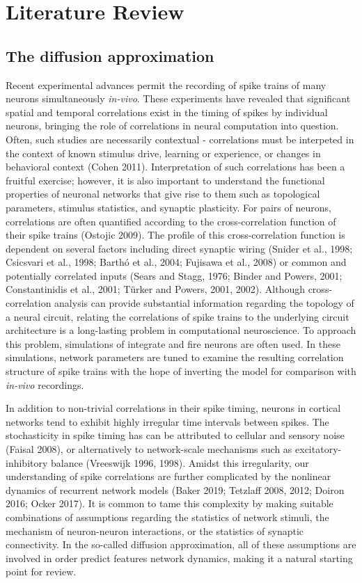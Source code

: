 \documentclass{ucetd}
\begin{document}
\section{Literature Review}

\subsection{The diffusion approximation}

Recent experimental advances permit the recording of spike trains of many neurons simultaneously \emph{in-vivo}. These experiments have revealed that significant spatial and temporal correlations exist in the timing of spikes by individual neurons, bringing the role of correlations in neural computation into question. Often, such studies are necessarily contextual - correlations must be interpeted in the context of known stimulus drive, learning or experience, or changes in behavioral context (Cohen 2011). Interpretation of such correlations has been a fruitful exercise; however, it is also important to understand the functional properties of neuronal networks that give rise to them such as topological parameters, stimulus statistics, and synaptic plasticity. For pairs of neurons, correlations are often quantified according to the cross-correlation function of their spike trains (Ostojic 2009). The profile of this cross-correlation function is dependent on several factors including direct synaptic wiring (Snider et al., 1998; Csicsvari et al., 1998; Barthó et al., 2004; Fujisawa et al., 2008) or common and potentially correlated inputs (Sears and Stagg, 1976; Binder and Powers, 2001; Constantinidis et al., 2001; Türker and Powers, 2001, 2002). Although cross-correlation analysis can provide substantial information regarding the topology of a neural circuit, relating the correlations of spike trains to the underlying circuit architecture is a long-lasting problem in computational neuroscience. To approach this problem, simulations of integrate and fire neurons are often used. In these simulations, network parameters are tuned to examine the resulting correlation structure of spike trains with the hope of inverting the model for comparison with \emph{in-vivo} recordings. 

In addition to non-trivial correlations in their spike timing, neurons in cortical networks tend to exhibit highly irregular time intervals between spikes. The stochasticity in spike timing has can be attributed to cellular and sensory noise (Faisal 2008), or alternatively to network-scale mechanisms such as excitatory-inhibitory balance (Vreeswijk 1996, 1998). Amidst this irregularity, our understanding of spike correlations are further complicated by the nonlinear dynamics of recurrent network models (Baker 2019; Tetzlaff 2008, 2012; Doiron 2016; Ocker 2017). It is common to tame this complexity by making suitable combinations of assumptions regarding the statistics of network stimuli, the mechanism of neuron-neuron interactions, or the statistics of synaptic connectivity. In the so-called diffusion approximation, all of these assumptions are involved in order predict features network dynamics, making it a natural starting point for review. 
\end{document}
